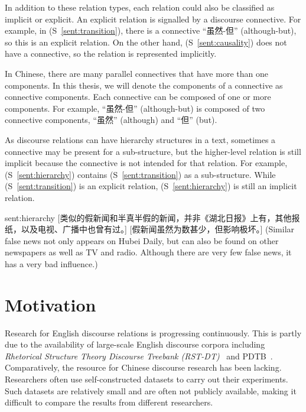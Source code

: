 In addition to these relation types, each relation could also be classified
as implicit or explicit. An explicit relation is signalled by a discourse connective.
For example, in (S~\ref{sent:transition}), there is a connective ``虽然-但''
(although-but), so this is an explicit relation. On the other hand,
(S~\ref{sent:causality}) does not have a connective, so the relation
is represented implicitly.

In Chinese, there are many parallel connectives that have more than one components.
In this thesis, we will denote the components of a connective as connective components.
Each connective can be composed of one or more components. For example, ``虽然-但''
(although-but) is composed of two connective components, ``虽然'' (although)
and ``但'' (but).

As discourse relations can have hierarchy structures in a text, sometimes
a connective may be present for a sub-structure, but the higher-level relation
is still implicit because the connective is not intended for that relation.
For example, (S~\ref{sent:hierarchy}) contains (S~\ref{sent:transition})
as a sub-structure. While (S~\ref{sent:transition}) is an explicit relation,
(S~\ref{sent:hierarchy}) is still an implicit relation.

\begin{sent}{sent:hierarchy}{}
    [类似的假新闻和半真半假的新闻，并非《湖北日报》上有，其他报纸，以及电视、广播中也曾有过。]
    [假新闻虽然为数甚少，但影响极坏。]
    (Similar false news not only appears on Hubei Daily, but can also be found on
    other newspapers as well as TV and radio.
    Although there are very few false news, it has a very bad influence.)
\end{sent}



%
%
\section{Motivation}

Research for English discourse relations is progressing continuously. This is partly
due to the availability of large-scale English discourse corpora including
\textit{Rhetorical Structure Theory Discourse Treebank (RST-DT)}~\citep{Carlson01building} and
PDTB~\citep{Prasad08thepenn}. Comparatively, the resource for Chinese discourse research
has been lacking. Researchers often use self-constructed datasets to carry out their experiments.
Such datasets are relatively small and are often not publicly available, making it difficult to compare
the results from different researchers.

